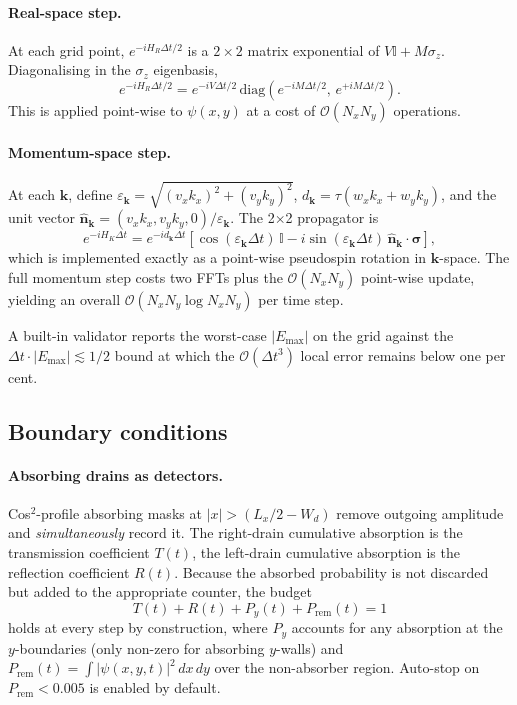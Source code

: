 \documentclass[preprint, 11pt]{elsarticle}
\begin{document}
\paragraph{Real-space step.}
At each grid point, $e^{-iH_R\Delta t/2}$ is a $2\times2$ matrix
exponential of $V\mathbb{I}+M\sigma_z$. Diagonalising in the $\sigma_z$
eigenbasis,
%
\begin{equation}
e^{-iH_R\Delta t/2} =
e^{-iV\Delta t/2}\,
\mathrm{diag}\!\left(e^{-iM\Delta t/2},\,e^{+iM\Delta t/2}\right).
\end{equation}
%
This is applied point-wise to $\psi(x,y)$ at a cost of
$\mathcal{O}(N_xN_y)$ operations.

\paragraph{Momentum-space step.}
At each $\mathbf{k}$, define
$\varepsilon_\mathbf{k}=\sqrt{(v_x k_x)^2+(v_y k_y)^2}$,
$d_\mathbf{k}=\tau(w_x k_x + w_y k_y)$, and the unit vector
$\hat{\mathbf{n}}_\mathbf{k}=(v_x k_x, v_y k_y, 0)/\varepsilon_\mathbf{k}$.
The 2$\times$2 propagator is
%
\begin{equation}
e^{-iH_K\Delta t} = e^{-id_\mathbf{k}\Delta t}
\left[\cos(\varepsilon_\mathbf{k}\Delta t)\,\mathbb{I}
   -i\sin(\varepsilon_\mathbf{k}\Delta t)\,\hat{\mathbf{n}}_\mathbf{k}\!\cdot\!\boldsymbol{\sigma}\right],
\label{eq:kprop}
\end{equation}
%
which is implemented exactly as a point-wise pseudospin rotation in
$\mathbf{k}$-space. The full momentum step costs two FFTs plus the
$\mathcal{O}(N_xN_y)$ point-wise update, yielding an overall
$\mathcal{O}(N_xN_y\log N_xN_y)$ per time step.

A built-in validator reports the worst-case
$|E_\mathrm{max}|$ on the grid against the
$\Delta t \cdot |E_\mathrm{max}| \lesssim 1/2$ bound at which the
$\mathcal{O}(\Delta t^3)$ local error remains below one per cent.

\subsection{Boundary conditions}
\label{sec:bcs}

\paragraph{Absorbing drains as detectors.}
Cos$^2$-profile absorbing masks at $|x|>(L_x/2-W_d)$ remove outgoing
amplitude and \emph{simultaneously} record it. The right-drain
cumulative absorption is the transmission coefficient $T(t)$, the
left-drain cumulative absorption is the reflection coefficient
$R(t)$. Because the absorbed probability is not discarded but added to
the appropriate counter, the budget
%
\begin{equation}
T(t)+R(t)+P_y(t)+P_\mathrm{rem}(t) = 1
\end{equation}
%
holds at every step by construction, where $P_y$ accounts for any
absorption at the $y$-boundaries (only non-zero for absorbing
$y$-walls) and $P_\mathrm{rem}(t)=\int|\psi(x,y,t)|^2\,dx\,dy$ over the
non-absorber region. Auto-stop on $P_\mathrm{rem}<0.005$ is enabled by
default.
\end{document}
